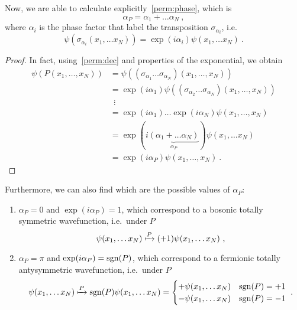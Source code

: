     Now, we are able to calculate explicitly~\eqref{perm:phase}, which is 
    \begin{equation}
        \alpha_P = \alpha_1 + \ldots \alpha_N~,
    \end{equation}
    where $\alpha_i$ is the phase factor that label the transposition $\sigma_{\alpha_i}$, i.e.
    \begin{equation*}
        \psi(\sigma_{\alpha_i}(x_1,\ldots x_N)) = \exp(i \alpha_i) \psi (x_1,\ldots x_N) ~.
    \end{equation*}
    \begin{proof}
        In fact, using~\eqref{perm:dec} and properties of the exponential, we obtain
        \begin{equation*}
        \begin{aligned}
            \psi(P(x_1,\ldots, x_N)) & = \psi((\sigma_{\alpha_1} \ldots \sigma_{\alpha_N}) (x_1,\ldots, x_N)) \\ & = \exp (i \alpha_1) \psi((\sigma_{\alpha_2} \ldots \sigma_{\alpha_N}) (x_1,\ldots, x_N)) \\ & ~~ \vdots \\ & = \exp (i \alpha_1) \ldots \exp (i \alpha_N) \psi(x_1,\ldots, x_N) \\ & = \exp (i \underbrace{(\alpha_1 + \ldots \alpha_N)}_{\alpha_P}) \psi(x_1,\ldots x_N) \\ &  = \exp (i \alpha_P) \psi(x_1,\ldots, x_N) ~.
        \end{aligned}
        \end{equation*}
    \end{proof}
    Furthermore, we can also find which are the possible values of $\alpha_P$:
    \begin{enumerate}
        \item $\alpha_P = 0$ and $\exp(i \alpha_P) = 1$, which correspond to a bosonic totally symmetric wavefunction, i.e.~under $P$
        \begin{equation*}
            \psi(x_1, \ldots x_N) \xmapsto{P} (+ 1) \psi(x_1, \ldots x_N) ~,
        \end{equation*}
        \item $\alpha_P = \pi$ and $\exp(i \alpha_P) = \operatorname{sgn}(P)$, which correspond to a fermionic totally antysymmetric wavefunction, i.e.~under $P$
        \begin{equation*}
            \psi(x_1, \ldots x_N) \xmapsto{P} \operatorname{sgn}(P) \psi(x_1, \ldots x_N) = \begin{cases}
                + \psi(x_1, \ldots x_N) & \operatorname{sgn}(P) = +1 \\
                - \psi(x_1, \ldots x_N) & \operatorname{sgn}(P) = - 1 \\
            \end{cases} ~.
        \end{equation*}
    \end{enumerate}
